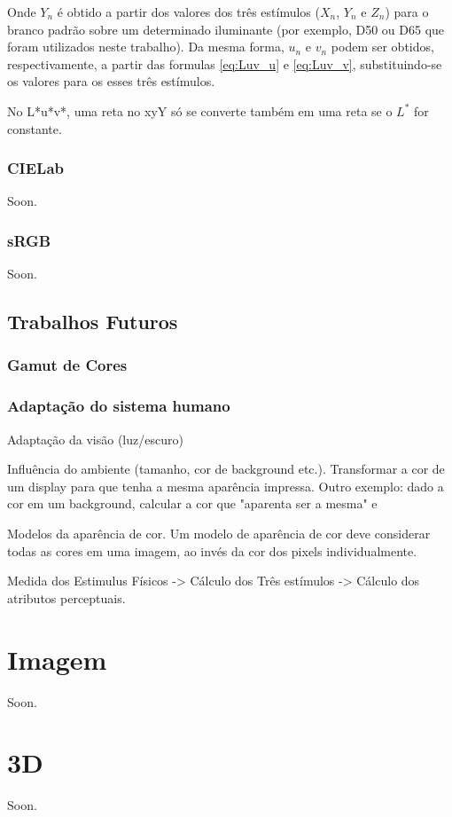 \documentclass[a4paper,10pt]{report}
\begin{document}
\par
Onde $Y_n$ é obtido a partir dos valores dos três estímulos ($X_n$, $Y_n$ e
$Z_n$) para o branco padrão sobre um determinado iluminante (por exemplo, D50
ou D65 que foram utilizados neste trabalho). Da mesma forma, $u_n$ e $v_n$
podem ser obtidos, respectivamente, a partir das formulas \ref{eq:Luv_u} e
\ref{eq:Luv_v}, substituindo-se os valores para os esses três estímulos.

\par
No L*u*v*, uma reta no xyY só se converte também em uma reta se o $L^*$ for
constante.



\subsection{CIELab}
Soon.

\subsection{sRGB}
Soon.

\section{Trabalhos Futuros}
\subsection{Gamut de Cores}

\subsection{Adaptação do sistema humano}
\par
Adaptação da visão (luz/escuro)

\par
Influência do ambiente (tamanho, cor de background etc.). Transformar a
cor de um display para que tenha a mesma aparência impressa. Outro exemplo:
dado a cor em um background, calcular a cor que "aparenta ser a mesma" e

\par
Modelos da aparência de cor. Um modelo de aparência de cor deve considerar
todas as cores em uma imagem, ao invés da cor dos pixels individualmente.

\par
Medida dos Estimulus Físicos -> Cálculo dos Três estímulos -> Cálculo dos
atributos perceptuais.

\chapter{Imagem}
Soon.

\chapter{3D}
Soon.
\end{document}
